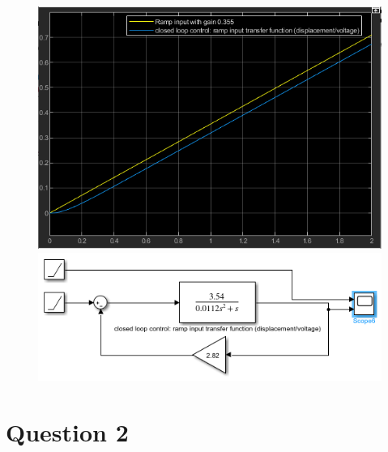 \documentclass[conference]{IEEEtran}
\begin{document}
\begin{figure}[htbp]
    \centering
    \begin{minipage}[b]{0.24\textwidth}
        \includegraphics[width=\textwidth]{./Graph/G9.png}
        \caption{}
        \label{RampInputClosedLoopTR}
    \end{minipage}
    \hfill
    \begin{minipage}[b]{0.24\textwidth}
        \centering
        \includegraphics[width=\textwidth]{./Graph/G9'.png}
        \caption{}
    \end{minipage}
\end{figure}
\section*{Question 2}
\end{document}
